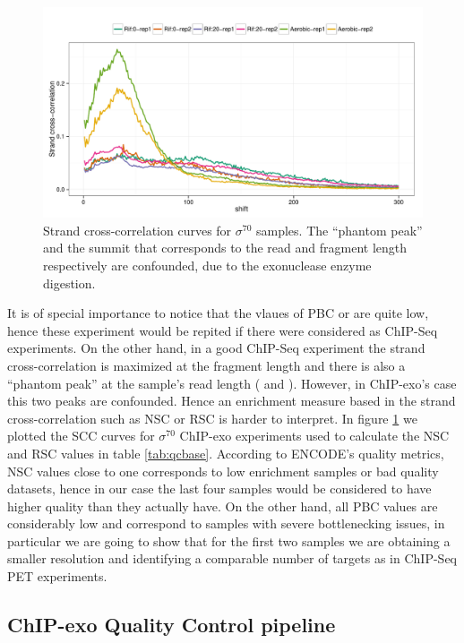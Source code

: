 \documentclass{bmcart}\usepackage[]{graphicx}\usepackage[]{color}
\begin{document}
\begin{figure}[h!]
  \centering
  \includegraphics[width = .8\textwidth]{../figs/for_paper/EColi_strand_cross_corr.pdf}
  \caption{Strand cross-correlation curves for $\sigma^{70}$
    samples. The ``phantom peak'' and the summit that corresponds to
    the read and fragment length respectively are confounded, due to
    the exonuclease enzyme digestion.}
  \label{figsup:scc}
\end{figure}

It is of special importance to notice that the vlaues of PBC or are
quite low, hence these experiment would be repited if there were
considered as ChIP-Seq experiments. On the other hand, in a good
ChIP-Seq experiment the strand cross-correlation is maximized at the
fragment length and there is also a ``phantom peak'' at the sample's
read length (\cite{encode_qc} and \cite{strandcc}).  However, in
ChIP-exo's case this two peaks are confounded. Hence an enrichment
measure based in the strand cross-correlation such as NSC or RSC is
harder to interpret. In figure \ref{figsup:scc} we plotted the SCC
curves for $\sigma^{70}$ ChIP-exo experiments used to calculate the
NSC and RSC values in table \ref{tab:qcbase}. According to ENCODE's
quality metrics, NSC values close to one corresponds to low enrichment
samples or bad quality datasets, hence in our case the last four
samples would be considered to have higher quality than they actually
have. On the other hand, all PBC values are considerably low and
correspond to samples with severe bottlenecking issues, in particular
we are going to show that for the first two samples we are obtaining a
smaller resolution and identifying a comparable number of targets as
in ChIP-Seq PET experiments.

\subsection{ChIP-exo Quality Control pipeline}
\label{sec:QC}
\end{document}
